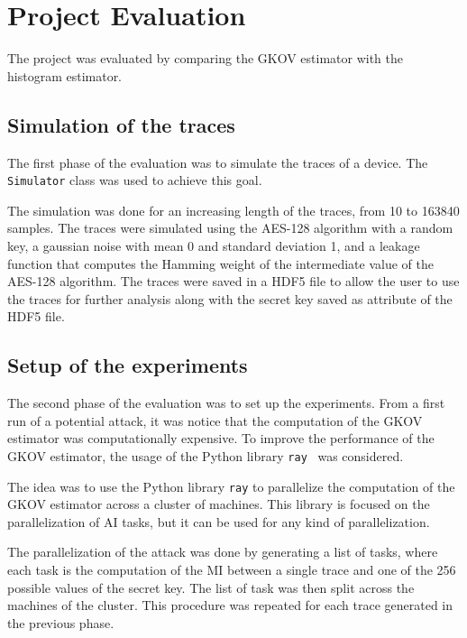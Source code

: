 \documentclass[12pt]{article}
\begin{document}
    \section{Project Evaluation}\label{sec:evaluation}
    The project was evaluated by comparing the GKOV estimator with the histogram estimator.

    \subsection{Simulation of the traces}\label{subsec:phase1}
    The first phase of the evaluation was to simulate the traces of a device.
    The \texttt{Simulator} class was used to achieve this goal.

    The simulation was done for an increasing length of the traces, from 10 to 163840 samples.
    The traces were simulated using the AES-128 algorithm with a random key, a gaussian noise with mean 0 and standard deviation 1, and a leakage function that computes the Hamming weight of the intermediate value of the AES-128 algorithm.
    The traces were saved in a HDF5 file to allow the user to use the traces for further analysis along with the secret key saved as attribute of the HDF5 file.

    \subsection{Setup of the experiments}\label{subsec:phase2}
    The second phase of the evaluation was to set up the experiments.
    From a first run of a potential attack, it was notice that the computation of the GKOV estimator was computationally expensive.
    To improve the performance of the GKOV estimator, the usage of the Python library \texttt{ray}~\cite{moritz2018ray} was considered.

    The idea was to use the Python library \texttt{ray} to parallelize the computation of the GKOV estimator across a cluster of machines.
    This library is focused on the parallelization of AI tasks, but it can be used for any kind of parallelization.

    The parallelization of the attack was done by generating a list of tasks, where each task is the computation of the MI between a single trace and one of the 256 possible values of the secret key.
    The list of task was then split across the machines of the cluster.
    This procedure was repeated for each trace generated in the previous phase.
\end{document}
